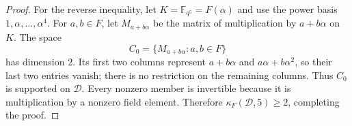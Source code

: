 \documentclass[11pt,reqno]{amsart}
\numberwithin{equation}{section}
\begin{document}
\begin{proof}
For the reverse inequality, let $K=\mathbb F_{q^5}=F(\alpha)$ and use the
power basis $1,\alpha,\ldots,\alpha^4$.  For $a,b\in F$, let
$M_{a+b\alpha}$ be the matrix of multiplication by $a+b\alpha$ on $K$.
The space
\[
 C_0=\{M_{a+b\alpha}:a,b\in F\}
\]
has dimension $2$.  Its first two columns represent
$a+b\alpha$ and $a\alpha+b\alpha^2$, so their last two entries vanish;
there is no restriction on the remaining columns.  Thus $C_0$ is
supported on $\mathcal D$.  Every nonzero member is invertible because it
is multiplication by a nonzero field element.  Therefore
$\kappa_F(\mathcal D,5)\ge2$, completing the proof.
\end{proof}
\end{document}
